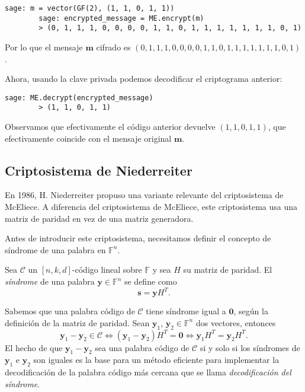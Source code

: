 \begin{exampleth}
    \begin{lstlisting}[gobble=4]
        sage: m = vector(GF(2), (1, 1, 0, 1, 1))
        sage: encrypted_message = ME.encrypt(m)
        > (0, 1, 1, 1, 0, 0, 0, 0, 1, 1, 0, 1, 1, 1, 1, 1, 1, 1, 0, 1)
    \end{lstlisting}
    
    Por lo que el mensaje $\textbf{m}$ cifrado es $(0, 1, 1, 1, 0, 0, 0, 0, 1, 1, 0, 1, 1, 1, 1, 1, 1, 1, 0, 1)$.

    Ahora, usando la clave privada podemos decodificar el criptograma anterior:

    \begin{lstlisting}[gobble=4]
        sage: ME.decrypt(encrypted_message)
        > (1, 1, 0, 1, 1)
    \end{lstlisting}

    Observamos que efectivamente el código anterior devuelve $(1, 1, 0, 1, 1)$, que efectivamente coincide con el mensaje original $\textbf{m}$.
\end{exampleth}

\subsection{Criptosistema de Niederreiter}

En 1986, H. Niederreiter \cite{Niederreiter_1986} propuso una variante relevante del criptosistema de McEliece. A diferencia del criptosistema de McEliece, este criptosistema usa una matriz de paridad en vez de una matriz generadora.

Antes de introducir este criptosistema, necesitamos definir el concepto de síndrome de una palabra en $\mathbb{F}^n$.

\begin{definition}
    Sea $\mathcal{C}$ un $[n, k, d]$-código lineal sobre $\mathbb{F}$ y sea $H$ su matriz de paridad. El \emph{síndrome} de una palabra $\textbf{y} \in \mathbb{F}^n$ se define como
    \[
        \textbf{s} = \textbf{y} H^T.
    \]
\end{definition}

Sabemos que una palabra código de $\mathcal{C}$ tiene síndrome igual a $\textbf{0}$, según la definición de la matriz de paridad. Sean $\textbf{y}_1$, $\textbf{y}_2 \in \mathbb{F}^n$ dos vectores, entonces
\[
    \textbf{y}_1 - \textbf{y}_2 \in \mathcal{C} \Leftrightarrow (\textbf{y}_1 - \textbf{y}_2) H^T = \textbf{0} \Leftrightarrow \textbf{y}_1 H^T = \textbf{y}_2 H^T.
\]
El hecho de que $\textbf{y}_1 - \textbf{y}_2$ sea una palabra código de $\mathcal{C}$ si y solo si los síndromes de $\textbf{y}_1$ e $\textbf{y}_2$ son iguales es la base para un método eficiente para implementar la decodificación de la palabra código más cercana que se llama \emph{decodificación del síndrome}.

